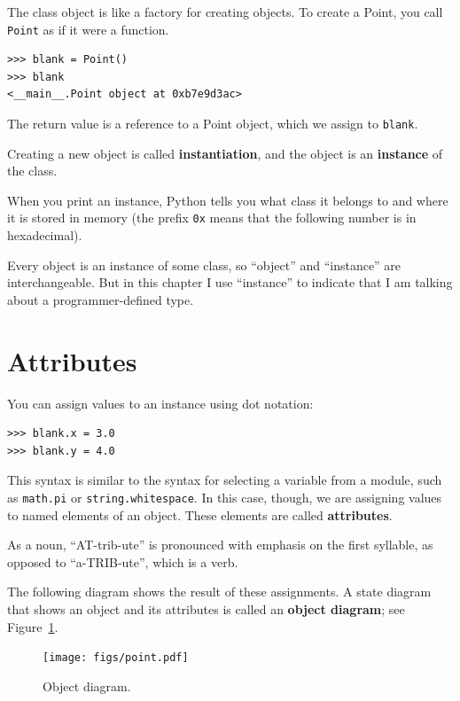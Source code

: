 \documentclass[10pt]{book}
\begin{document}
The class object is like a factory for creating objects.  To create a
Point, you call {\tt Point} as if it were a function.

\begin{verbatim}
>>> blank = Point()
>>> blank
<__main__.Point object at 0xb7e9d3ac>
\end{verbatim}
%
The return value is a reference to a Point object, which we
assign to {\tt blank}.  

Creating a new object is called
{\bf instantiation}, and the object is an {\bf instance} of
the class.

When you print an instance, Python tells you what class it
belongs to and where it is stored in memory (the prefix
{\tt 0x} means that the following number is in hexadecimal).

Every object is an instance of some class, so ``object'' and
``instance'' are interchangeable.  But in this chapter I use
``instance'' to indicate that I am talking about a programmer-defined
type.


\section{Attributes}
\label{attributes}

You can assign values to an instance using dot notation:

\begin{verbatim}
>>> blank.x = 3.0
>>> blank.y = 4.0
\end{verbatim}
%
This syntax is similar to the syntax for selecting a variable from a
module, such as {\tt math.pi} or {\tt string.whitespace}.  In this case,
though, we are assigning values to named elements of an object.
These elements are called {\bf attributes}.

As a noun, ``AT-trib-ute'' is pronounced with emphasis on the first
syllable, as opposed to ``a-TRIB-ute'', which is a verb.

The following diagram shows the result of these assignments.
A state diagram that shows an object and its attributes is
called an {\bf object diagram}; see Figure~\ref{fig.point}.

\begin{figure}
\centerline
{\texttt{[image: figs/point.pdf]}}
\caption{Object diagram.}
\label{fig.point}
\end{figure}
\end{document}
